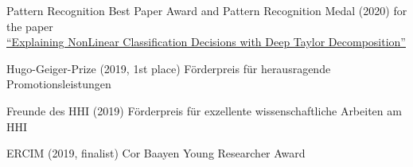 \documentclass[10pt,a4paper]{article} %
\begin{document}
\spacedhrule{1.6em}{-0.4em} %









\inlineheadsection
{Pattern Recognition Best Paper Award and Pattern Recognition Medal (2020)}
{
    for the paper\\
    \href{https://doi.org/10.1016/j.patcog.2016.11.008}{\qquad ``Explaining NonLinear Classification Decisions with Deep Taylor Decomposition''}
}

\vspace{5pt}
\inlineheadsection %
{Hugo-Geiger-Prize (2019, 1st place)}
{
    F\"orderpreis f\"ur herausragende Promotionsleistungen
}

\vspace{5pt}
\inlineheadsection %
{Freunde des HHI (2019)}
{
    F\"orderpreis f\"ur exzellente wissenschaftliche Arbeiten am HHI
}

\vspace{5pt}
\inlineheadsection %
{ERCIM (2019, finalist)}
{
    Cor Baayen Young Researcher Award
}
\end{document}
